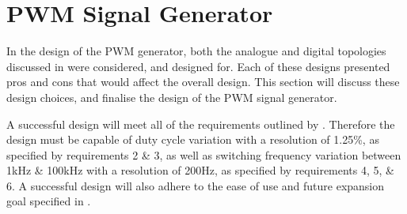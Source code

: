 



%
%

\section{PWM Signal Generator}\label{S:pwm_gen_design}

In the design of the PWM generator, both the analogue and digital topologies discussed in  were considered, and designed for. Each of these designs presented pros and cons that would affect the overall design. This section will discuss these design choices, and finalise the design of the PWM signal generator.

A successful design will meet all of the requirements outlined by . Therefore the design must be capable of duty cycle variation with a resolution of 1.25\%, as specified by requirements 2 \& 3, as well as switching frequency variation between 1kHz \& 100kHz with a resolution of 200Hz, as specified by requirements 4, 5, \& 6. A successful design will also adhere to the ease of use and future expansion goal specified in .

